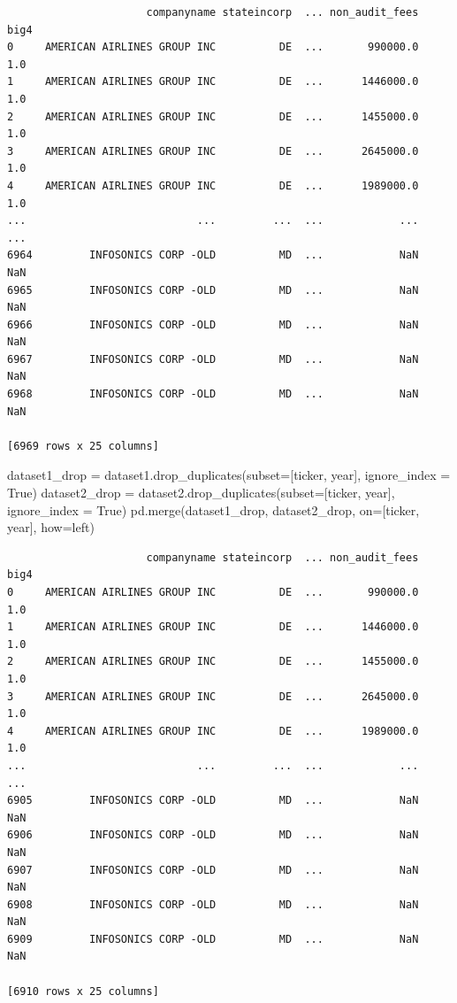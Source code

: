 \documentclass[
  letterpaper,
  DIV=11,
  numbers=noendperiod]{scrreprt}
\newenvironment{Shaded}{\begin{snugshade}}{\end{snugshade}}
\newcommand{\NormalTok}[1]{\textcolor[rgb]{0.00,0.23,0.31}{#1}}
\newcommand{\OperatorTok}[1]{\textcolor[rgb]{0.37,0.37,0.37}{#1}}
\newcommand{\StringTok}[1]{\textcolor[rgb]{0.13,0.47,0.30}{#1}}
\newcommand{\VariableTok}[1]{\textcolor[rgb]{0.07,0.07,0.07}{#1}}
\begin{document}
\begin{verbatim}
                      companyname stateincorp  ... non_audit_fees  big4
0     AMERICAN AIRLINES GROUP INC          DE  ...       990000.0   1.0
1     AMERICAN AIRLINES GROUP INC          DE  ...      1446000.0   1.0
2     AMERICAN AIRLINES GROUP INC          DE  ...      1455000.0   1.0
3     AMERICAN AIRLINES GROUP INC          DE  ...      2645000.0   1.0
4     AMERICAN AIRLINES GROUP INC          DE  ...      1989000.0   1.0
...                           ...         ...  ...            ...   ...
6964         INFOSONICS CORP -OLD          MD  ...            NaN   NaN
6965         INFOSONICS CORP -OLD          MD  ...            NaN   NaN
6966         INFOSONICS CORP -OLD          MD  ...            NaN   NaN
6967         INFOSONICS CORP -OLD          MD  ...            NaN   NaN
6968         INFOSONICS CORP -OLD          MD  ...            NaN   NaN

[6969 rows x 25 columns]
\end{verbatim}

\begin{Shaded}
\begin{Highlighting}[]
\NormalTok{dataset1\_drop }\OperatorTok{=}\NormalTok{ dataset1.drop\_duplicates(subset}\OperatorTok{=}\NormalTok{[}\StringTok{\textquotesingle{}ticker\textquotesingle{}}\NormalTok{, }\StringTok{\textquotesingle{}year\textquotesingle{}}\NormalTok{], ignore\_index }\OperatorTok{=} \VariableTok{True}\NormalTok{)}
\NormalTok{dataset2\_drop }\OperatorTok{=}\NormalTok{ dataset2.drop\_duplicates(subset}\OperatorTok{=}\NormalTok{[}\StringTok{\textquotesingle{}ticker\textquotesingle{}}\NormalTok{, }\StringTok{\textquotesingle{}year\textquotesingle{}}\NormalTok{], ignore\_index }\OperatorTok{=} \VariableTok{True}\NormalTok{)}
\NormalTok{pd.merge(dataset1\_drop, dataset2\_drop, on}\OperatorTok{=}\NormalTok{[}\StringTok{\textquotesingle{}ticker\textquotesingle{}}\NormalTok{, }\StringTok{\textquotesingle{}year\textquotesingle{}}\NormalTok{], how}\OperatorTok{=}\StringTok{\textquotesingle{}left\textquotesingle{}}\NormalTok{)}
\end{Highlighting}
\end{Shaded}

\begin{verbatim}
                      companyname stateincorp  ... non_audit_fees  big4
0     AMERICAN AIRLINES GROUP INC          DE  ...       990000.0   1.0
1     AMERICAN AIRLINES GROUP INC          DE  ...      1446000.0   1.0
2     AMERICAN AIRLINES GROUP INC          DE  ...      1455000.0   1.0
3     AMERICAN AIRLINES GROUP INC          DE  ...      2645000.0   1.0
4     AMERICAN AIRLINES GROUP INC          DE  ...      1989000.0   1.0
...                           ...         ...  ...            ...   ...
6905         INFOSONICS CORP -OLD          MD  ...            NaN   NaN
6906         INFOSONICS CORP -OLD          MD  ...            NaN   NaN
6907         INFOSONICS CORP -OLD          MD  ...            NaN   NaN
6908         INFOSONICS CORP -OLD          MD  ...            NaN   NaN
6909         INFOSONICS CORP -OLD          MD  ...            NaN   NaN

[6910 rows x 25 columns]
\end{verbatim}
\end{document}
